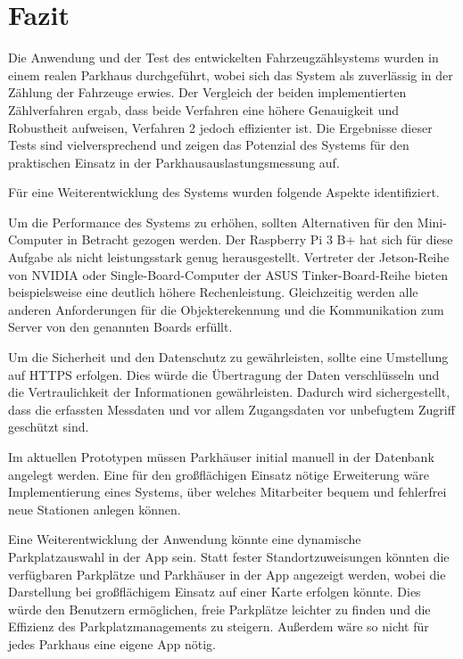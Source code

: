 \section{Fazit}\label{ch:Fazit}

Die Anwendung und der Test des entwickelten Fahrzeugzählsystems wurden in einem realen Parkhaus durchgeführt, wobei sich das System als zuverlässig in der Zählung der Fahrzeuge erwies.
Der Vergleich der beiden implementierten Zählverfahren ergab, dass beide Verfahren eine höhere Genauigkeit und Robustheit aufweisen, Verfahren 2 jedoch effizienter ist.
Die Ergebnisse dieser Tests sind vielversprechend und zeigen das Potenzial des Systems für den praktischen Einsatz in der Parkhausauslastungsmessung auf.

Für eine Weiterentwicklung des Systems wurden folgende Aspekte identifiziert.

Um die Performance des Systems zu erhöhen, sollten Alternativen für den Mini-Computer in Betracht gezogen werden.
Der Raspberry Pi 3 B+ hat sich für diese Aufgabe als nicht leistungsstark genug herausgestellt.
Vertreter der Jetson-Reihe von NVIDIA oder Single-Board-Computer der ASUS Tinker-Board-Reihe bieten beispielsweise eine deutlich höhere Rechenleistung.
Gleichzeitig werden alle anderen Anforderungen für die Objekterekennung und die Kommunikation zum Server von den genannten Boards erfüllt.

Um die Sicherheit und den Datenschutz zu gewährleisten, sollte eine Umstellung auf HTTPS erfolgen.
Dies würde die Übertragung der Daten verschlüsseln und die Vertraulichkeit der Informationen gewährleisten.
Dadurch wird sichergestellt, dass die erfassten Messdaten und vor allem Zugangsdaten vor unbefugtem Zugriff geschützt sind.

Im aktuellen Prototypen müssen Parkhäuser initial manuell in der Datenbank angelegt werden.
Eine für den großflächigen Einsatz nötige Erweiterung wäre Implementierung eines Systems, über welches Mitarbeiter bequem und fehlerfrei neue Stationen anlegen können.

Eine Weiterentwicklung der Anwendung könnte eine dynamische Parkplatzauswahl in der App sein.
Statt fester Standortzuweisungen könnten die verfügbaren Parkplätze und Parkhäuser in der App angezeigt werden, wobei die Darstellung bei großflächigem Einsatz auf einer Karte erfolgen könnte.
Dies würde den Benutzern ermöglichen, freie Parkplätze leichter zu finden und die Effizienz des Parkplatzmanagements zu steigern.
Außerdem wäre so nicht für jedes Parkhaus eine eigene App nötig.

